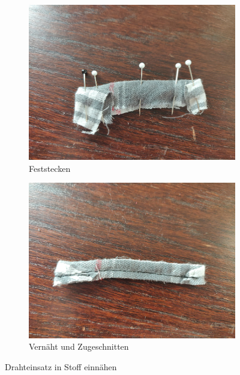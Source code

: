 \documentclass[12pt,parskip=full]{scrartcl}
\begin{document}
\begin{figure}[hb]
    \begin{subfigure}{0.48\textwidth}
        \centering
        \includegraphics[width = \linewidth]{Pictures/02_MetalStrip/MetalStrip_03_resized.jpg}
        \caption{Feststecken}
        \label{MetaStrip3}
    \end{subfigure}
    \begin{subfigure}{0.48\textwidth}
        \centering
        \includegraphics[width = \linewidth]{Pictures/02_MetalStrip/MetalStrip_04_resized.jpg}
        \caption{Vernäht und Zugeschnitten}
        \label{MetaStrip4}
    \end{subfigure}
    \caption{Drahteinsatz in Stoff einnähen}
    \label{MetaStrip}
\end{figure}
\end{document}
